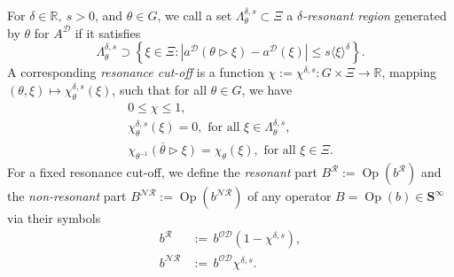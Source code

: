 \documentclass[AHL,Unicode,longabstracts,published]{cedram}
\DeclareMathOperator{\Op}{Op}
\newcommand{\R}{\mathbb R}
\newcommand{\CD}{\mathcal{D}}
\newcommand{\CN}{\mathcal{N}}
\newcommand{\CO}{\mathcal{O}}
\newcommand{\CR}{\mathcal{R}}
\newcommand{\CNR}{{\CN\!\CR}}
\newcommand{\BS}{\mathbf S}
\newcommand{\resc}{s}
\newcommand{\rco}{\chi}
\newcommand{\act}{\triangleright}
\renewcommand{\subseteq}{\subset}
\renewcommand{\supseteq}{\supset}
\newcommand{\abs}[1]{\left\lvert #1 \right\rvert}
\newcommand{\set}[1]{\left\{ #1 \right\}}
\newcommand{\ang}[1]{\langle #1 \rangle}
\begin{document}
\begin{defi}\label{def:resonant}
For $\delta \in \R,\ \resc>0$, and $\theta \in G$, we call a set $\Lambda_\theta^{\delta,\resc}\subseteq \Xi$ a $\delta$\emph{-resonant region} generated by $\theta$ for $A^\CD$ if it satisfies
\begin{equation}\label{eq:resonantregion}
\Lambda_\theta^{\delta,\resc} \supseteq \set{\xi \in \Xi : \abs{a^\CD(\theta\act\xi) - a^\CD(\xi)} \leq \resc \ang \xi^\delta}.
\end{equation}
A corresponding \emph{resonance cut-off} is a function $\rco :=\rco^{\delta, s} : G\times\Xi \to \R$, mapping $(\theta,\xi)\mapsto \rco_\theta^{\delta, s}(\xi)$, such that for all $\theta\in G$, we have
\begin{equation}\label{eq:dennonres}
\begin{gathered}
0\leq \rco \leq 1,\\
\rco_{\theta}^{\delta,s}(\xi)=0,\text{ for all }\xi\in\Lambda_\theta^{\delta,s},\\
\overline{\rco_{\theta^{-1}}(\theta\act\xi)}=\rco_\theta(\xi),\text{ for all }\xi\in\Xi.
\end{gathered}
\end{equation}
For a fixed resonance cut-off, we define the \emph{resonant} part $B^{\CR}:=\Op(b^{\CR})$ and the \emph{non-resonant} part $B^{\CNR}:=\Op(b^{\CNR})$ of any operator $B=\Op(b)\in\BS^\infty$ via their symbols
\begin{equation}\label{eq:resnonres}
\begin{aligned}
b^\CR &{:=}\, b^{\CO\CD}\left(1 - \rco^{\delta,s}\right), \\
b^{\CNR} &{:=}\, b^{\CO\CD}\rco^{\delta,s}.
\end{aligned}
\end{equation}
\end{defi}
\end{document}

